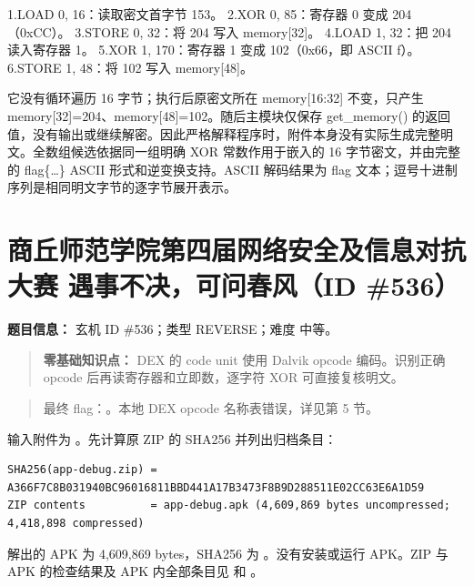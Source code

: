 1.LOAD 0, 16：读取密文首字节 153。 2.XOR 0, 85：寄存器 0 变成 204（0xCC）。 3.STORE 0, 32：将 204 写入 memory{[}32{]}。 4.LOAD 1, 32：把 204 读入寄存器 1。 5.XOR 1, 170：寄存器 1 变成 102（0x66，即 ASCII f）。 6.STORE 1, 48：将 102 写入 memory{[}48{]}。

它没有循环遍历 16 字节；执行后原密文所在 memory{[}16:32{]} 不变，只产生 memory{[}32{]}=204、memory{[}48{]}=102。随后主模块仅保存 get\_memory() 的返回值，没有输出或继续解密。因此严格解释程序时，附件本身没有实际生成完整明文。全数组候选依据同一组明确 XOR 常数作用于嵌入的 16 字节密文，并由完整的 flag\{\ldots\} ASCII 形式和逆变换支持。ASCII 解码结果为 flag 文本；逗号十进制序列是相同明文字节的逐字节展开表示。

\section{商丘师范学院第四届网络安全及信息对抗大赛 遇事不决，可问春风（ID \#536）}\label{ux5546ux4e18ux5e08ux8303ux5b66ux9662ux7b2cux56dbux5c4aux7f51ux7edcux5b89ux5168ux53caux4fe1ux606fux5bf9ux6297ux5927ux8d5b-ux9047ux4e8bux4e0dux51b3ux53efux95eeux6625ux98ceid-536}

\textbf{题目信息：} 玄机 ID \#536；类型 REVERSE；难度 中等。

\begin{quote}
\textbf{零基础知识点：} DEX 的 code unit 使用 Dalvik opcode 编码。识别正确 opcode 后再读寄存器和立即数，逐字符 XOR 可直接复核明文。
\end{quote}

\begin{quote}
最终 flag：\texttt{}。本地 DEX opcode 名称表错误，详见第 5 节。
\end{quote}

输入附件为 \texttt{}。先计算原 ZIP 的 SHA256 并列出归档条目：

\begin{verbatim}
SHA256(app-debug.zip) = A366F7C8B031940BC96016811BBD441A17B3473F8B9D288511E02CC63E6A1D59
ZIP contents          = app-debug.apk (4,609,869 bytes uncompressed; 4,418,898 compressed)
\end{verbatim}

解出的 APK 为 4,609,869 bytes，SHA256 为 \texttt{}。没有安装或运行 APK。ZIP 与 APK 的检查结果及 APK 内全部条目见 \texttt{} 和 \texttt{}。

